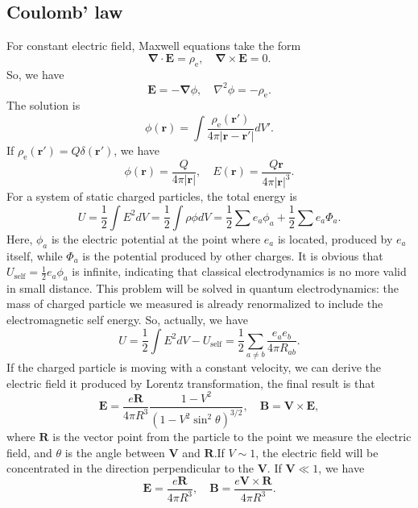 \subsection{Coulomb' law}
For constant electric field, Maxwell equations take the form 
\[\bm{\nabla} \cdot \bm{E} = \rho_{\mathrm{e}} , \quad \bm{\nabla} \times \bm{E} = 0.\]
So, we have
\[\bm{E} = -\bm{\nabla} \phi , \quad \nabla^2 \phi = -\rho_{\mathrm{e}} .\]
The solution is
\[\phi(\bm{r}) = \int  \frac{\rho_{\mathrm{e}}(\bm{r}')}{4\pi|\bm{r}-\bm{r}'|} dV'.\]
If $\rho_{\mathrm{e}}(\bm{r}') = Q \delta(\bm{r}')$, we have
\[\phi(\bm{r}) =  \frac{Q}{4\pi|\bm{r}|} , \quad E(\bm{r}) = \frac{Q\bm{r}}{4\pi|\bm{r}|^3}.\]
For a system of static charged particles, the total energy is
\[U = \frac{1}{2}\int E^2 dV = \frac{1}{2} \int \rho \phi dV = \frac{1}{2} \sum e_a \phi_a + \frac{1}{2}\sum e_a \Phi_a.\]
Here, $\phi_a$ is the electric potential at the point where $e_a$ is located, produced by $e_a$ itself, while  $\Phi_a$ is the potential produced by other charges. It is obvious that $U_{\mathrm{self}} = \frac{1}{2} e_a \phi_a$ is infinite, indicating that classical electrodynamics is no more valid in small distance. This problem will be solved in quantum electrodynamics: the mass of charged particle we measured is already renormalized to include the electromagnetic self energy. So, actually, we have
\[U = \frac{1}{2}\int E^2 dV - U_{\mathrm{self}} = \frac{1}{2}\sum_{a \ne b} \frac{e_a e_b}{4\pi R_{ab}}.\]
If the charged particle is moving with a constant velocity, we can derive the electric field it produced by Lorentz transformation, the final result is that
\[\bm{E} = \frac{e\bm{R}}{4\pi R^3} \frac{1-V^2}{(1-V^2\sin^2\theta)^{3/2}} , \quad \bm{B} = \bm{V} \times \bm{E},\]
where $\bm{R}$ is the vector point from the particle to the point we measure the electric field, and $\theta$ is the angle between $\bm{V}$ and $\bm{R}$.If $V \sim 1$, the electric field will be concentrated in the direction perpendicular to the $\bm{V}$. If $\bm{V} \ll 1$, we have
\[\bm{E} = \frac{e\bm{R}}{4\pi R^3} , \quad \bm{B} = \frac{e\bm{V} \times\bm{R}}{4\pi R^3}.\]

